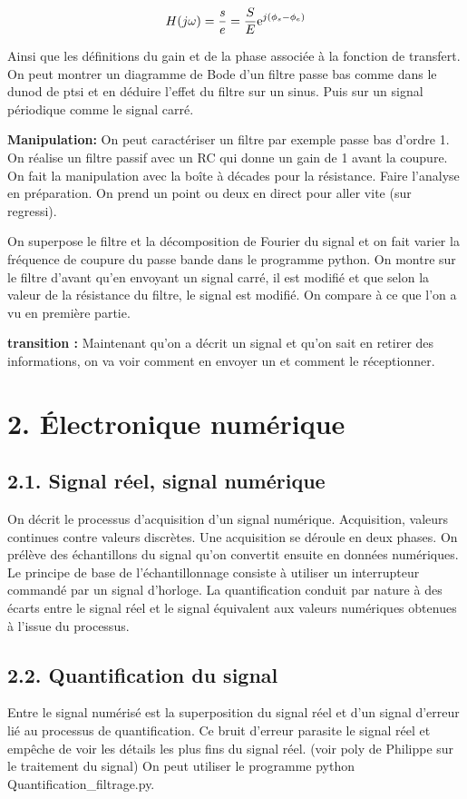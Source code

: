 \documentclass[french, a4paper, 10pt, twocolumn, landscape]{article}
\begin{document}
\begin{equation}
  H(j\omega) = \dfrac{s}{e} = \dfrac{S}{E}{\rm e}^{j(\phi_s-\phi_e)}
\end{equation}

Ainsi que les définitions du gain et de la phase  associée à la fonction de transfert.  On peut montrer un diagramme de Bode d'un filtre passe bas comme dans le dunod de ptsi et en déduire l'effet du filtre sur un sinus. Puis sur un  signal périodique comme le signal carré.\medskip

\textbf{Manipulation:} On peut caractériser un filtre par exemple passe bas d'ordre 1. On réalise un filtre passif avec un RC qui donne un gain de 1 avant la coupure. On fait la manipulation avec la boîte à décades pour la résistance. Faire l'analyse en préparation. On prend un point ou deux en direct pour aller vite (sur regressi).\medskip

On superpose le filtre et la décomposition de Fourier du signal et on fait varier la fréquence de coupure du passe bande dans le programme python. On montre sur le filtre d'avant qu'en envoyant un signal carré, il est modifié et que selon la valeur de la résistance du filtre, le signal est modifié.  On compare à ce que l'on a vu en première partie.

\textbf{transition : } Maintenant qu’on a décrit un signal et qu’on sait en retirer des informations, on va voir comment en envoyer un et comment le réceptionner.


\section*{2. Électronique numérique}

\subsection*{2.1. Signal réel, signal numérique}
On décrit le processus d'acquisition d'un signal numérique. Acquisition, valeurs continues contre valeurs discrètes. Une acquisition se déroule en deux phases. On prélève des échantillons du signal qu’on convertit ensuite en données numériques. Le principe de base de l’échantillonnage consiste à utiliser un interrupteur commandé par un signal d’horloge. La quantification conduit par nature à des écarts entre le signal réel et le signal équivalent aux valeurs numériques obtenues à l’issue du processus.


\subsection*{2.2. Quantification du signal}
Entre le signal numérisé est la superposition du signal réel et d'un signal d'erreur lié au processus de quantification. Ce bruit d'erreur parasite le signal réel et empêche de voir les détails les plus fins du signal réel. (voir poly de Philippe sur le traitement du signal)
On peut utiliser le programme python Quantification_filtrage.py. 
\end{document}

